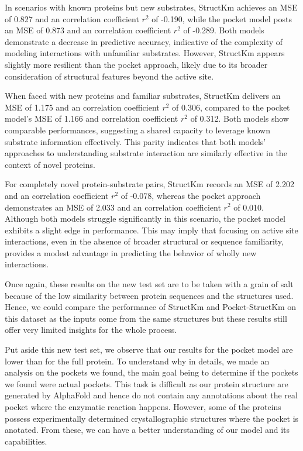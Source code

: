 In scenarios with known proteins but new substrates, StructKm achieves an MSE of 0.827 and an correlation coefficient $r^2$ of -0.190, while the pocket model posts an MSE of 0.873 and an correlation coefficient $r^2$ of -0.289. Both models demonstrate a decrease in predictive accuracy, indicative of the complexity of modeling interactions with unfamiliar substrates. However, StructKm appears slightly more resilient than the pocket approach, likely due to its broader consideration of structural features beyond the active site.

When faced with new proteins and familiar substrates, StructKm delivers an MSE of 1.175 and an correlation coefficient $r^2$ of 0.306, compared to the pocket model's MSE of 1.166 and correlation coefficient $r^2$ of 0.312. Both models show comparable performances, suggesting a shared capacity to leverage known substrate information effectively. This parity indicates that both models' approaches to understanding substrate interaction are similarly effective in the context of novel proteins.

For completely novel protein-substrate pairs, StructKm records an MSE of 2.202 and an correlation coefficient $r^2$ of -0.078, whereas the pocket approach demonstrates an MSE of 2.033 and an correlation coefficient $r^2$ of 0.010. Although both models struggle significantly in this scenario, the pocket model exhibits a slight edge in performance. This may imply that focusing on active site interactions, even in the absence of broader structural or sequence familiarity, provides a modest advantage in predicting the behavior of wholly new interactions.

Once again, these results on the new test set are to be taken with a grain of salt because of the low similarity between protein sequences and the structures used. Hence, we could compare the performance of StructKm and Pocket-StructKm on this dataset as the inputs come from the same structures but these results still offer very limited insights for the whole process.

Put aside this new test set, we observe that our results for the pocket model are lower than for the full protein. To understand why in details, we made an analysis on the pockets we found, the main goal being to determine if the pockets we found were actual pockets. This task is difficult as our protein structure are generated by AlphaFold and hence do not contain any annotations about the real pocket where the enzymatic reaction happens. However, some of the proteins possess experimentally determined crystallographic structures where the pocket is anotated. From  these, we can have a better understanding of our model and its capabilities.

